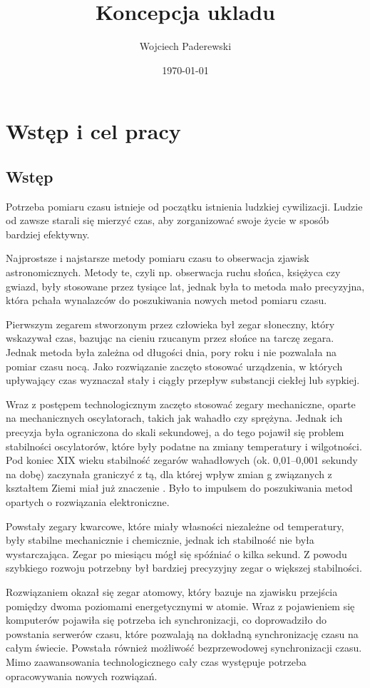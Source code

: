 \documentclass[../main.tex]{subfiles}
\author{Wojciech Paderewski}
\date{\today}
\title{Koncepcja ukladu}
\begin{document}
 \section{Wstęp i cel pracy}
 
 \subsection{Wstęp}
 Potrzeba pomiaru czasu istnieje od początku istnienia ludzkiej cywilizacji. 
 Ludzie od zawsze starali się mierzyć czas, aby zorganizować swoje życie w sposób bardziej efektywny.
 
 Najprostsze i najstarsze metody pomiaru czasu to obserwacja zjawisk astronomicznych.
 Metody te, czyli np. obserwacja ruchu słońca, księżyca czy gwiazd, były stosowane przez tysiące lat,
  jednak była to metoda mało precyzyjna, która pchała wynalazców do poszukiwania nowych metod pomiaru czasu.
 
 Pierwszym zegarem stworzonym przez człowieka był zegar słoneczny, który wskazywał czas, 
 bazując na cieniu rzucanym przez słońce na tarczę zegara. Jednak metoda była zależna od długości dnia, 
 pory roku i nie pozwalała na pomiar czasu nocą.
 Jako rozwiązanie zaczęto stosować urządzenia, w których upływający czas wyznaczał stały i ciągły przepływ 
 substancji ciekłej lub sypkiej.
 
 Wraz z postępem technologicznym zaczęto stosować zegary mechaniczne, oparte na mechanicznych oscylatorach,
  takich jak wahadło czy sprężyna. Jednak ich precyzja była ograniczona do skali sekundowej, 
  a do tego pojawił się problem stabilności oscylatorów, które były podatne na zmiany temperatury i wilgotności.
   Pod koniec XIX wieku stabilność zegarów wahadłowych (ok. 0,01–0,001 sekundy na dobę) zaczynała graniczyć z tą, 
   dla której wpływ zmian g związanych z kształtem Ziemi miał już znaczenie \cite{st:czas}.
    Było to impulsem do poszukiwania metod opartych o rozwiązania elektroniczne.
 
 Powstały zegary kwarcowe, które miały własności niezależne od temperatury, były stabilne mechanicznie i chemicznie, 
 jednak ich stabilność nie była wystarczająca. Zegar po miesiącu mógł się spóźniać o kilka sekund. 
 Z powodu szybkiego rozwoju potrzebny był bardziej precyzyjny zegar o większej stabilności.
 
 Rozwiązaniem okazał się zegar atomowy, który bazuje na zjawisku przejścia pomiędzy dwoma poziomami energetycznymi
  w atomie. Wraz z pojawieniem się komputerów pojawiła się potrzeba ich synchronizacji, co doprowadziło do powstania
   serwerów czasu, które pozwalają na dokładną synchronizację czasu na całym świecie. 
   Powstała również możliwość bezprzewodowej synchronizacji czasu. Mimo zaawansowania technologicznego cały czas 
   występuje potrzeba opracowywania nowych rozwiązań.
 
\end{document}
